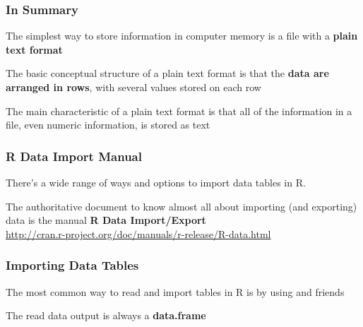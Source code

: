 \documentclass[12pt]{beamer}\usepackage[]{graphicx}\usepackage[]{color}
\begin{document}

\begin{frame}
\frametitle{In Summary}

\bbi
  \item The simplest way to store information in computer memory is a file with a \textbf{plain text format}
  \item The basic conceptual structure of a plain text format is that the \textbf{data are arranged in rows}, with several values stored on each row
  \item The main characteristic of a plain text format is that all of the information in a file, even numeric information, is stored as text
\ei
\eb

\end{frame}


\begin{frame}
\begin{center}
\Huge{}
\end{center}
\end{frame}


\begin{frame}
\frametitle{R Data Import Manual}

There's a wide range of ways and options to import data tables in R.

\bigskip
The authoritative document to know almost all about importing (and exporting) data is the manual \textbf{R Data Import/Export} \\
{\footnotesize \url{http://cran.r-project.org/doc/manuals/r-release/R-data.html}}

\end{frame}


\begin{frame}
\frametitle{Importing Data Tables}

The most common way to read and import tables in R is by using {\hilit {}} and friends

\bigskip
The read data output is always a \textbf{data.frame}

\end{frame}

\end{document}
